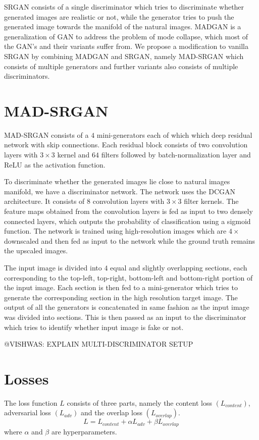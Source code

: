 \documentclass[12pt,a4paper,twocolumn]{article}
\begin{document}
        SRGAN consists of a single discriminator which tries to discriminate whether generated images are realistic or not, while the generator tries to push the generated image towards the manifold of the natural images.
        MADGAN \cite{madgan} is a generalization of GAN to address the problem of mode collapse, which most of the GAN's and their variants suffer from.
        We propose a modification to vanilla SRGAN by combining MADGAN and SRGAN, namely MAD-SRGAN which consists of multiple generators and further variants also consists of multiple discriminators.

    \section{MAD-SRGAN}
        MAD-SRGAN consists of a $4$ mini-generators each of which which deep residual network \cite{resnet} with skip connections.
        Each residual block consists of two convolution layers with $3\times3$ kernel and $64$ filters followed by batch-normalization \cite{batch-norm} layer and ReLU as the activation function.

        To discriminate whether the generated images lie close to natural images manifold, we have a discriminator network.
        The network uses the DCGAN \cite{dcgan} architecture.
        It consists of $8$ convolution layers with $3\times3$ filter kernels.
        The feature maps obtained from the convolution layers is fed as input to two densely connected layers, which outputs the probability of classification using a sigmoid function.
        The network is trained using high-resolution images which are $4\times$ downscaled and then fed as input to the network while the ground truth remains the upscaled images.

        The input image is divided into $4$ equal and slightly overlapping sections, each corresponding to the top-left, top-right, bottom-left and bottom-right portion of the input image.
        Each section is then fed to a mini-generator which tries to generate the corresponding section in the high resolution target image.
        The output of all the generators is concatenated in same fashion as the input image was divided into sections.
        This is then passed as an input to the discriminator which tries to identify whether input image is fake or not.

        @VISHWAS: EXPLAIN MULTI-DISCRIMINATOR SETUP

    \section{Losses}
        The loss function $L$ consists of three parts, namely the content loss $(L_{content})$, adversarial loss $(L_{adv})$ and the overlap loss $(L_{overlap})$.\\
            $$L = L_{content} + \alpha L_{adv} + \beta L_{overlap}$$
        where $\alpha$ and $\beta$ are hyperparameters.
\end{document}
